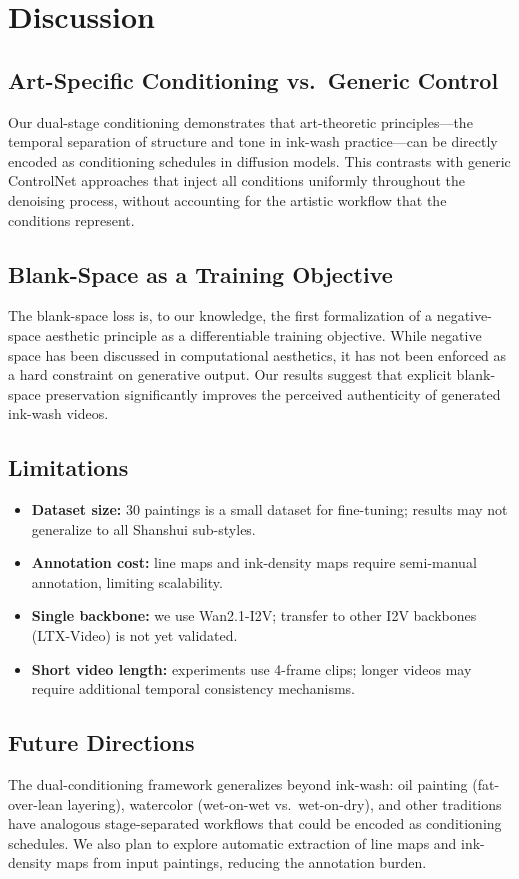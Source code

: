 \section{Discussion}
\label{sec:discussion}

\subsection{Art-Specific Conditioning vs.\ Generic Control}

Our dual-stage conditioning demonstrates that art-theoretic
principles---the temporal separation of structure and tone in
ink-wash practice---can be directly encoded as conditioning
schedules in diffusion models. This contrasts with generic
ControlNet approaches that inject all conditions uniformly
throughout the denoising process, without accounting for the
artistic workflow that the conditions represent.

\subsection{Blank-Space as a Training Objective}

The blank-space loss is, to our knowledge, the first formalization
of a negative-space aesthetic principle as a differentiable
training objective. While negative space has been discussed in
computational aesthetics, it has not been enforced as a hard
constraint on generative output. Our results suggest that explicit
blank-space preservation significantly improves the perceived
authenticity of generated ink-wash videos.

\subsection{Limitations}

\begin{itemize}
    \item \textbf{Dataset size:} 30 paintings is a small dataset
    for fine-tuning; results may not generalize to all Shanshui
    sub-styles.
    \item \textbf{Annotation cost:} line maps and ink-density maps
    require semi-manual annotation, limiting scalability.
    \item \textbf{Single backbone:} we use Wan2.1-I2V; transfer to
    other I2V backbones (LTX-Video) is not yet validated.
    \item \textbf{Short video length:} experiments use 4-frame
    clips; longer videos may require additional temporal
    consistency mechanisms.
\end{itemize}

\subsection{Future Directions}

The dual-conditioning framework generalizes beyond ink-wash: oil
painting (fat-over-lean layering), watercolor (wet-on-wet vs.\
wet-on-dry), and other traditions have analogous stage-separated
workflows that could be encoded as conditioning schedules. We also
plan to explore automatic extraction of line maps and ink-density
maps from input paintings, reducing the annotation burden.
